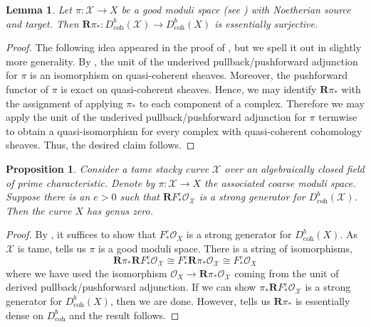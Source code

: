 \documentclass[11pt]{amsart}
\theoremstyle{plain}
\newtheorem{lemma}[theorem]{Lemma}
\newtheorem{proposition}[theorem]{Proposition}
\theoremstyle{definition}
\numberwithin{equation}{section}
\numberwithin{theorem}{section}
\begin{document}
\begin{lemma}
    \label{lem:good_moduli_dense}
    Let $\pi \colon \mathcal{X} \to X$ be a good moduli space (see \cite[\S 4]{Alper:2013}) with Noetherian source and target. 
    Then $\mathbf{R}\pi_\ast\colon D^b_{\operatorname{coh}}(\mathcal{X}) \to D^b_{\operatorname{coh}}(X)$ is essentially surjective.
\end{lemma}

\begin{proof}
    The following idea appeared in the proof of \cite[Lemma 2.17]{Ballard/Favero:2012}, but we spell it out in slightly more generality. 
    By \cite[Proposition 4.5]{Alper:2013}, the unit of the underived pullback/pushforward adjunction for $\pi$ is an isomorphism on quasi-coherent sheaves. 
    Moreover, the pushforward functor of $\pi$ is exact on quasi-coherent sheaves. 
    Hence, we may identify $\mathbf{R}\pi_\ast$ with the assignment of applying $\pi_\ast$ to each component of a complex. 
    Therefore we may apply the unit of the underived pullback/pushforward adjunction for $\pi$ termwise to obtain a quasi-isomorphism for every complex with quasi-coherent cohomology sheaves. 
    Thus, the desired claim follows.
\end{proof}

\begin{proposition}
    \label{prop:F-thickness_stacky_curve}
    Consider a tame stacky curve $\mathcal{X}$ over an algebraically closed field of prime characteristic. 
    Denote by $\pi\colon \mathcal{X} \to X$ the associated coarse moduli space. Suppose there is an $e>0$ such that $\mathbf{R} F_\ast^e \mathcal{O}_{\mathcal{X}}$ is a strong generator for $D^b_{\operatorname{coh}}(\mathcal{X})$. 
    Then the curve $X$ has genus zero. 
\end{proposition}

\begin{proof}
    By \cite[Theorem 4.10]{Ballard/Iyengar/Lank/Mukhopadhyay/Pollitz:2023}, it suffices to show that $F_\ast^e \mathcal{O}_X$ is a strong generator for $D^b_{\operatorname{coh}}(X)$. 
    As $\mathcal{X}$ is tame, \cite[Example 8.1]{Alper:2013} tells us $\pi$ is a good moduli space.
    There is a string of isomorphisms,
    \begin{displaymath}
        \mathbf{R}\pi_\ast \mathbf{R} F_\ast^e \mathcal{O}_{\mathcal{X}} \cong F_\ast^e \mathbf{R} \pi_\ast \mathcal{O}_{\mathcal{X}} \cong F_\ast^e \mathcal{O}_X
    \end{displaymath}
    where we have used the isomorphism $\mathcal{O}_X \to \mathbf{R} \pi_\ast \mathcal{O}_{\mathcal{X}}$ coming from the unit of derived pullback/pushforward adjunction. 
    If we can show $\pi_\ast \mathbf{R} F_\ast^e \mathcal{O}_{\mathcal{X}}$ is a strong generator for $D^b_{\operatorname{coh}}(X)$, then we are done. However,  tells us $\mathbf{R} \pi_\ast$ is essentially dense on $D^b_{\operatorname{coh}}$ and the result follows.
\end{proof}
\end{document}
